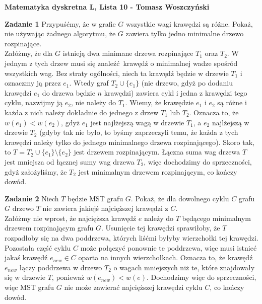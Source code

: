\documentclass[a4paper,12pt]{article}
\begin{document}
\noindent \textbf{Matematyka dyskretna L, Lista 10 - Tomasz Woszczyński}\newline

\noindent \newline \textbf{Zadanie 1} \newline
Przypuśćmy, że w grafie $G$ wszystkie wagi krawędzi są różne. Pokaż, nie używając
żadnego algorytmu, że $G$ zawiera tylko jedno minimalne drzewo rozpinające. \\

\noindent Załóżmy, że dla $G$ istnieją dwa minimane drzewa rozpinające $T_1$
oraz $T_2$. W jednym z tych drzew musi się znaleźć krawędź o minimalnej wadze
spośród wszystkich wag. Bez straty ogólności, niech ta krawędź będzie w drzewie
$T_1$ i oznaczmy ją przez $e_1$. Wtedy graf $T_2 \cup \{ e_1 \}$ (nie drzewo,
gdyż po dodaniu krawędzi $e_1$ do drzewa będzie $n$ krawędzi) zawiera cykl 
i jedna z krawędzi tego cyklu, nazwijmy ją $e_2$, nie należy do $T_1$. Wiemy, że 
krawędzie $e_1$ i $e_2$ są różne i każda z nich należy dokładnie do jednego 
z drzew $T_1$ lub $T_2$. Oznacza to, że $w(e_1) < w(e_2)$, gdyż $e_1$ jest
najlżejszą wagą w drzewie $T_1$, a $e_2$ najlżejszą w drzewie $T_2$ (gdyby tak
nie było, to byśmy zaprzeczyli temu, że każda z tych krawędzi należy tylko
do jednego minimalnego drzewa rozpinającego). Skoro tak, to 
$T = T_2 \cup \{ e_1 \} \setminus \{ e_2 \}$ jest drzewem rozpinającym. Łączna
suma wag drzewa $T$ jest mniejsza od łącznej sumy wag drzewa $T_2$, więc 
dochodzimy do sprzeczności, gdyż założyliśmy, że $T_2$ jest minimalnym
drzewem rozpinającym, co kończy dowód.

\noindent \newline \textbf{Zadanie 2} \newline
Niech $T$ będzie MST grafu $G$. Pokaż, że dla dowolnego cyklu $C$ grafu $G$
drzewo $T$ nie zawiera jakiejś najcięższej krawędzi z $C$. \\

\noindent Załóżmy nie wprost, że najcięższa krawędź $e$ należy do $T$ będącego
minimalnym drzewem rozpinającym grafu $G$. Usunięcie tej krawędzi sprawiłoby,
że $T$ rozpadłoby się na dwa poddrzewa, których liśćmi byłyby wierzchołki 
tej krawędzi. Pozostała część cyklu $C$ może połączyć ponownie te poddrzewa,
więc musi istnieć jakaś krawędź $e_{new} \in C$ oparta na innych wierzchołkach. 
Oznacza to, że krawędź $e_{new}$ łączy poddrzewa w drzewo $T_2$ o wagach 
mniejszych niż te, które znajdowały się w drzewie $T$, ponieważ 
$w(e_{new}) < w(e)$. Dochodzimy więc do sprzeczności, więc MST grafu $G$ nie
może zawierać najcięższej krawędzi cyklu $C$, co kończy dowód.
\end{document}
